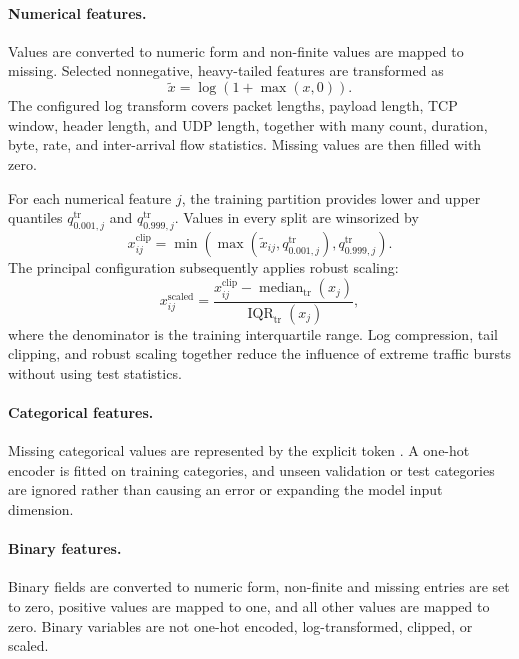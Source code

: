 \paragraph{Numerical features.}
Values are converted to numeric form and non-finite values are mapped to
missing. Selected nonnegative, heavy-tailed features are transformed as
\begin{equation}
    \widetilde{x}=\log(1+\max(x,0)).
    \label{eq:log1p_preprocessing}
\end{equation}
The configured log transform covers packet lengths, payload length, TCP window,
header length, and UDP length, together with many count, duration, byte, rate,
and inter-arrival flow statistics. Missing values are then filled with zero.

For each numerical feature $j$, the training partition provides lower and
upper quantiles $q_{0.001,j}^{\mathrm{tr}}$ and
$q_{0.999,j}^{\mathrm{tr}}$. Values in every split are winsorized by
\begin{equation}
    x_{ij}^{\mathrm{clip}}
    = \min\!\left(
        \max\!\left(\widetilde{x}_{ij},q_{0.001,j}^{\mathrm{tr}}\right),
        q_{0.999,j}^{\mathrm{tr}}
      \right).
    \label{eq:quantile_clipping}
\end{equation}
The principal configuration subsequently applies robust scaling:
\begin{equation}
    x_{ij}^{\mathrm{scaled}}
    = \frac{x_{ij}^{\mathrm{clip}}-
             \operatorname{median}_{\mathrm{tr}}(x_j)}
            {\operatorname{IQR}_{\mathrm{tr}}(x_j)},
    \label{eq:robust_scaling}
\end{equation}
where the denominator is the training interquartile range. Log compression,
tail clipping, and robust scaling together reduce the influence of extreme
traffic bursts without using test statistics.

\paragraph{Categorical features.}
Missing categorical values are represented by the explicit token
. A one-hot encoder is fitted on training categories,
and unseen validation or test categories are ignored rather than causing an
error or expanding the model input dimension.

\paragraph{Binary features.}
Binary fields are converted to numeric form, non-finite and missing entries are
set to zero, positive values are mapped to one, and all other values are mapped
to zero. Binary variables are not one-hot encoded, log-transformed, clipped, or
scaled.

